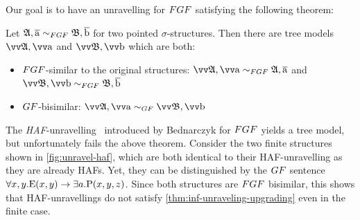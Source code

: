 Our goal is to have an unravelling for $\FGF$ satisfying the following theorem:
\begin{theorem}\label{thm:inf-unraveling-upgrading}
  Let $\str{A}, \elemtuplea \bisimto_{\FGF} \str{B}, \elemtupleb$ for two pointed $\sigma$-structures.
  Then there are tree models $\unravel{A}, \elemtuptuplea$ and $\unravel{B}, \elemtuptupleb$ which are both:
  \begin{itemize}
    \item $\FGF$-similar to the original structures: $\unravel{A}, \elemtuptuplea \bisimto_{\FGF} \str{A}, \elemtuplea$ and $\unravel{B}, \elemtuptupleb \bisimto_{\FGF} \str{B}, \elemtupleb$
    \item $\GF$-bisimilar: $\unravel{A}, \elemtuptuplea \bisimto_{\GF} \unravel{B}, \elemtuptupleb$
  \end{itemize}
\end{theorem}
The \emph{HAF}-unravelling~\cite[Sec 3.3]{Bednarczyk21} introduced by Bednarczyk for $\FGF$ yields a tree model, but unfortunately fails the above theorem.
Consider the two finite structures shown in \cref{fig:unravel-haf}, which are both identical to their HAF-unravelling as they are already HAFs.
Yet, they can be distinguished by the $\GF$ sentence $\forall{x,y}. \mathrm{E}(x,y) \to \exists a. \mathrm{P}(x,y,z)$.
Since both structures are $\FGF$ bisimilar, this shows that HAF-unravellings do not satisfy \ref{thm:inf-unraveling-upgrading} even in the finite case.
